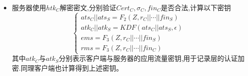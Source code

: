 \begin{itemize}
\[\begin{cases}
        \sigma_C = Sign_{sk_C}(l_{CCV}||H_3)\\
        H_4 = H(r_C || \cdots || Cert_S || \sigma_S ||Cert_C || \sigma_C  )\\
        fin_C = HMAC(fk_C,H_4)
    \end{cases}
    \]
    其中$l_{CCV}$表示固定标签信息。使用$htk_C$加密$\{ Cert_C || \sigma_C || fin_C   \}$,将密文发送给服务器。
    \item [4.]服务器使用$htk_C$解密密文,分别验证$Cert_C,\sigma_C,fin_C$是否合法,计算以下密钥
    \[
        \begin{cases}
            ats_C || ats_S = F_2(Z,r_C||\cdots ||fin_S)\\
            atk_C || atk_S = KDF(ats_C || ats_S,\epsilon)\\
            ems = F_3(Z,r_C||\cdots ||fin_S)\\
            rms = F_3(Z,r_C||\cdots ||fin_C)        
        \end{cases}
    \]
    其中$atk_C$与$atk_S$分别表示客户端与服务器的应用流量密钥,用于记录层的认证加密.同理客户端也计算得到上述密钥。
\end{itemize}